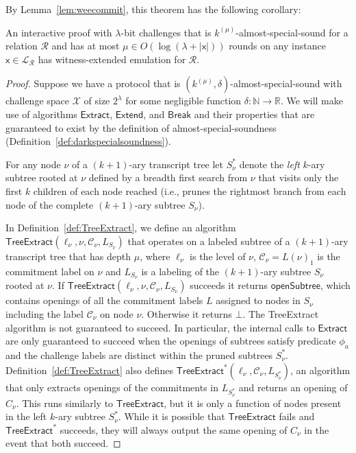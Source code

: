 By Lemma~\ref{lem:weecommit}, this theorem has the following corollary:
\begin{corollary}
\label{cor:dsstowee}
An interactive proof with $\lambda$-bit challenges that is $k^{(\mu)}$-almost-special-sound for a relation $\mathcal{R}$ and has at most $\mu \in O(\log(\lambda + |\mathsf{x}|))$ rounds on any instance $\mathsf{x} \in \mathcal{L}_\mathcal{R}$ has witness-extended emulation for $\mathcal{R}$.  
\end{corollary}



\begin{proof} 
Suppose we have a protocol that is $(k^{(\mu)}, \delta)$-almost-special-sound with challenge space $\mathcal{X}$ of size $2^\lambda$ for some negligible function $\delta: \mathbb{N} \rightarrow \mathbb{R}$. We will make use of algorithms $\textsf{Extract}$, $\textsf{Extend}$, and $\textsf{Break}$ and their properties that are guaranteed to exist by the definition of almost-special-soundness (Definition~\ref{def:darkspecialsoundness}). 

For any node $\nu$ of a $(k+1)$-ary transcript tree let $S^*_\nu$ denote the \emph{left} $k$-ary subtree rooted at $\nu$ defined by a breadth first search from $\nu$ that visits only the first $k$ children of each node reached (i.e., prunes the rightmost branch from each node of the complete $(k+1)$-ary subtree $S_\nu$).

In Definition~\ref{def:TreeExtract}, we define an algorithm $\textsf{TreeExtract}(\ell_\nu, \nu, \mathcal{C}_\nu, L_{S_\nu})$ that operates on a labeled subtree of a $(k+1)$-ary transcript tree that has depth $\mu$,  where $\ell_\nu$ is the level of $\nu$, $\mathcal{C}_\nu = L(\nu)_1$ is the commitment label on $\nu$ and $L_{S_\nu}$ is a labeling of the $(k+1)$-ary subtree $S_\nu$ rooted at $\nu$. If $\textsf{TreeExtract}(\ell_\nu, \nu, \mathcal{C}_\nu, L_{S_\nu})$ succeeds it returns $\textsf{openSubtree}$, which contains openings of all the commitment labels $L$ assigned to nodes in $S_\nu$ including the label $\mathcal{C}_\nu$ on node $\nu$. Otherwise it returns $\bot$. The \textsf{TreeExtract} algorithm is not guaranteed to succeed. In particular, the internal calls to $\textsf{Extract}$ are only guaranteed to succeed when the openings of subtrees satisfy predicate $\phi_a$ and the challenge labels are distinct within the pruned subtrees $S^*_\nu$. Definition~\ref{def:TreeExtract} also defines $\textsf{TreeExtract}^*(\ell_\nu, \mathcal{C}_\nu, L_{S^*_\nu})$, an algorithm that only extracts openings of the commitments in $L_{S^*_\nu}$ and returns an opening of $C_\nu$. This runs similarly to $\textsf{TreeExtract}$, but it is only a function of nodes present in the left $k$-ary subtree $S^*_\nu$. While it is possible that $\textsf{TreeExtract}$ fails and $\textsf{TreeExtract}^*$ succeeds, they will always output the same opening of $C_\nu$ in the event that both succeed.


\end{proof}
